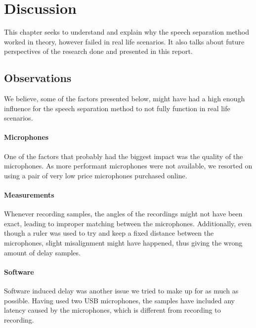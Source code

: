 \chapter{Discussion}\label{ch:discussion}
This chapter seeks to understand and explain why the speech separation method worked in theory,
however failed in real life scenarios.
It also talks about future perspectives of the research done and presented in this report.
\section{Observations}
We believe, some of the factors presented below, might have had a high enough influence for the speech 
separation method to not fully function in real life scenarios.
\subsubsection{Microphones}
One of the factors that probably had the biggest impact was the quality of the microphones. As more
performant microphones were not available, we resorted on using a pair of very low price microphones
purchased online.
\subsubsection{Measurements}
Whenever recording samples, the angles of the recordings might not have been exact, leading to improper 
matching between the microphones. Additionally, even though a ruler was used to try and keep a fixed 
distance between the microphones, slight misalignment might have happened, thus giving the wrong
amount of delay samples.
\subsubsection{Software}
Software induced delay was another issue we tried to make up for as much as possible. Having used two USB 
microphones, the samples have included any latency caused by the microphones, which is different from 
recording to recording.\cite{USBLATENCY}
\newpage

